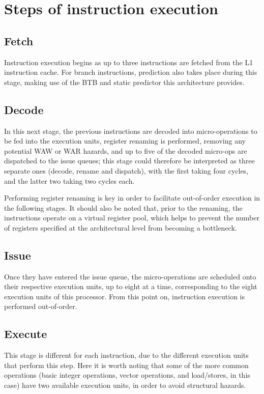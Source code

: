 \section{Steps of instruction execution}
\subsection*{Fetch}
\hspace{\parindent}Instruction execution begins as up to three instructions are fetched from the L1 instruction cache. For branch instructions, prediction also takes place during this stage, making use of the BTB and static predictor this architecture provides.
\subsection*{Decode}
\hspace{\parindent}In this next stage, the previous instructions are decoded into micro-operations to be fed into the execution units, register renaming is performed, removing any potential WAW or WAR hazards, and up to five of the decoded micro-ops are dispatched to the issue queues; this stage could therefore be interpreted as three separate ones (decode, rename and dispatch), with the first taking four cycles, and the latter two taking two cycles each.

Performing register renaming is key in order to facilitate out-of-order execution in the following stages. It should also be noted that, prior to the renaming, the instructions operate on a virtual register pool, which helps to prevent the number of registers specified at the architectural level from becoming a bottleneck. \cite{renaming}
\subsection*{Issue}
\hspace{\parindent}Once they have entered the issue queue, the micro-operations are scheduled onto their respective execution units, up to eight at a time, corresponding to the eight execution units of this processor. From this point on, instruction execution is performed out-of-order.
\subsection*{Execute}
\hspace{\parindent}This stage is different for each instruction, due to the different execution units that perform this step. Here it is worth noting that some of the more common operations (basic integer operations, vector operations, and load/stores, in this case) have two available execution units, in order to avoid structural hazards.
